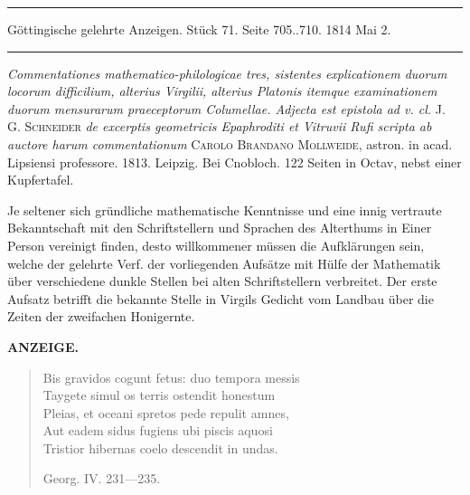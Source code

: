 \par\bigskip
\hypertarget{native-572-lower}{}
\begin{center}
\parbox{.92\linewidth}{\centering\small
\rule{\linewidth}{.3pt}\par\smallskip
Göttingische gelehrte Anzeigen. Stück 71. Seite 705..710. 1814 Mai 2.\par\smallskip
\rule{\linewidth}{.3pt}}
\end{center}
\par\medskip

\emph{Commentationes mathematico-philologicae tres, sistentes explicationem duorum locorum difficilium, alterius Virgilii, alterius Platonis itemque examinationem duorum mensurarum praeceptorum Columellae. Adjecta est epistola ad v. cl.} J. G. \textsc{Schneider} \emph{de excerptis geometricis Epaphroditi et Vitruvii Rufi scripta ab auctore harum commentationum} \textsc{Carolo Brandano Mollweide}, astron. in acad. Lipsiensi professore. 1813. Leipzig. Bei Cnobloch. 122 Seiten in Octav, nebst einer Kupfertafel.

Je seltener sich gründliche mathematische Kenntnisse und eine innig vertraute Bekanntschaft mit den Schriftstellern und Sprachen des Alterthums in Einer Person vereinigt finden, desto willkommener müssen die Aufklärungen sein, welche der gelehrte Verf. der vorliegenden Aufsätze mit Hülfe der Mathematik über verschiedene dunkle Stellen bei alten Schriftstellern verbreitet. Der erste Aufsatz betrifft die bekannte Stelle in Virgils Gedicht vom Landbau über die Zeiten der zweifachen Honigernte.

\par
\clearpage
{}
\noindent{}%
\parbox[b]{\dimexpr\textwidth-20mm\relax}{\centering\small\textbf{ANZEIGE.}}%
\makebox[10mm][r]{}\par\nobreak\medskip
\begin{quote}\small Bis gravidos cogunt fetus: duo tempora messis \\ Taygete simul os terris ostendit honestum \\ Pleias, et oceani spretos pede repulit amnes, \\ Aut eadem sidus fugiens ubi piscis aquosi \\ Tristior hibernas coelo descendit in undas.

\hfill Georg. IV. 231---235. \end{quote}

